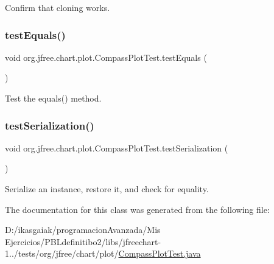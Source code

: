 Confirm that cloning works. \mbox{\label{classorg_1_1jfree_1_1chart_1_1plot_1_1_compass_plot_test_aac4ecadb82b48e465e6cd133ea0ca622}} 
\subsubsection{\texorpdfstring{test\+Equals()}{testEquals()}}
{\footnotesize\ttfamily void org.\+jfree.\+chart.\+plot.\+Compass\+Plot\+Test.\+test\+Equals (\begin{DoxyParamCaption}{ }\end{DoxyParamCaption})}

Test the equals() method. \mbox{\label{classorg_1_1jfree_1_1chart_1_1plot_1_1_compass_plot_test_ab7a717a3548f806b5240268de3a6da17}} 
\subsubsection{\texorpdfstring{test\+Serialization()}{testSerialization()}}
{\footnotesize\ttfamily void org.\+jfree.\+chart.\+plot.\+Compass\+Plot\+Test.\+test\+Serialization (\begin{DoxyParamCaption}{ }\end{DoxyParamCaption})}

Serialize an instance, restore it, and check for equality. 

The documentation for this class was generated from the following file\+:\begin{DoxyCompactItemize}
\item 
D\+:/ikasgaiak/programacion\+Avanzada/\+Mis Ejercicios/\+P\+B\+Ldefinitibo2/libs/jfreechart-\/1../tests/org/jfree/chart/plot/\mbox{\hyperlink{_compass_plot_test_8java}{Compass\+Plot\+Test.\+java}}\end{DoxyCompactItemize}
